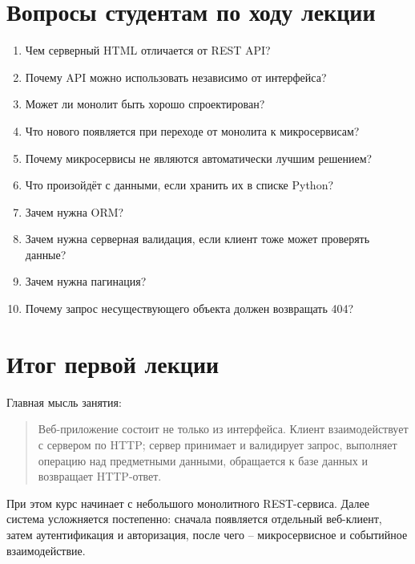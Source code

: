 \documentclass[12pt,a4paper]{article}
\begin{document}
\section{Вопросы студентам по ходу лекции}
\begin{enumerate}
    \item Чем серверный HTML отличается от REST API?
    \item Почему API можно использовать независимо от интерфейса?
    \item Может ли монолит быть хорошо спроектирован?
    \item Что нового появляется при переходе от монолита к микросервисам?
    \item Почему микросервисы не являются автоматически лучшим решением?
    \item Что произойдёт с данными, если хранить их в списке Python?
    \item Зачем нужна ORM?
    \item Зачем нужна серверная валидация, если клиент тоже может проверять данные?
    \item Зачем нужна пагинация?
    \item Почему запрос несуществующего объекта должен возвращать 404?
\end{enumerate}

\section{Итог первой лекции}
Главная мысль занятия:
\begin{quote}
Веб-приложение состоит не только из интерфейса. Клиент взаимодействует с сервером по HTTP; сервер принимает и валидирует запрос, выполняет операцию над предметными данными, обращается к базе данных и возвращает HTTP-ответ.
\end{quote}

При этом курс начинает с небольшого монолитного REST-сервиса. Далее система усложняется постепенно: сначала появляется отдельный веб-клиент, затем аутентификация и авторизация, после чего -- микросервисное и событийное взаимодействие.
\end{document}
